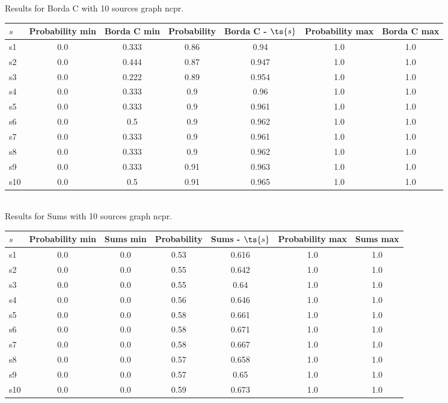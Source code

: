 \documentclass{article}
\begin{document}
\noindent Results for Borda C with 10 sources graph ncpr.

\noindent\begin{tabular}{|l|c|c|c|c|c|c|}
\hline
$s$& Probability min & Borda C min & Probability & Borda C - $\ts{s}$ & Probability max & Borda C max\\
\hline
s1 &0.0 & 0.333 & 0.86 & 0.94 & 1.0 & 1.0\\
\hline
s2 &0.0 & 0.444 & 0.87 & 0.947 & 1.0 & 1.0\\
\hline
s3 &0.0 & 0.222 & 0.89 & 0.954 & 1.0 & 1.0\\
\hline
s4 &0.0 & 0.333 & 0.9 & 0.96 & 1.0 & 1.0\\
\hline
s5 &0.0 & 0.333 & 0.9 & 0.961 & 1.0 & 1.0\\
\hline
s6 &0.0 & 0.5 & 0.9 & 0.962 & 1.0 & 1.0\\
\hline
s7 &0.0 & 0.333 & 0.9 & 0.961 & 1.0 & 1.0\\
\hline
s8 &0.0 & 0.333 & 0.9 & 0.962 & 1.0 & 1.0\\
\hline
s9 &0.0 & 0.333 & 0.91 & 0.963 & 1.0 & 1.0\\
\hline
s10 &0.0 & 0.5 & 0.91 & 0.965 & 1.0 & 1.0\\
\hline
\end{tabular}\\

\noindent Results for Sums with 10 sources graph ncpr.

\noindent\begin{tabular}{|l|c|c|c|c|c|c|}
\hline
$s$& Probability min & Sums min & Probability & Sums - $\ts{s}$ & Probability max & Sums max\\
\hline
s1 &0.0 & 0.0 & 0.53 & 0.616 & 1.0 & 1.0\\
\hline
s2 &0.0 & 0.0 & 0.55 & 0.642 & 1.0 & 1.0\\
\hline
s3 &0.0 & 0.0 & 0.55 & 0.64 & 1.0 & 1.0\\
\hline
s4 &0.0 & 0.0 & 0.56 & 0.646 & 1.0 & 1.0\\
\hline
s5 &0.0 & 0.0 & 0.58 & 0.661 & 1.0 & 1.0\\
\hline
s6 &0.0 & 0.0 & 0.58 & 0.671 & 1.0 & 1.0\\
\hline
s7 &0.0 & 0.0 & 0.58 & 0.667 & 1.0 & 1.0\\
\hline
s8 &0.0 & 0.0 & 0.57 & 0.658 & 1.0 & 1.0\\
\hline
s9 &0.0 & 0.0 & 0.57 & 0.65 & 1.0 & 1.0\\
\hline
s10 &0.0 & 0.0 & 0.59 & 0.673 & 1.0 & 1.0\\
\hline
\end{tabular}\\
\end{document}
